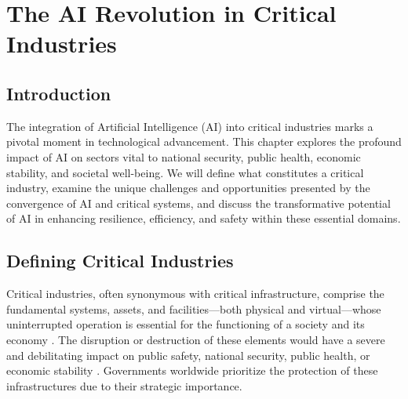 \chapter{The AI Revolution in Critical Industries}
\label{chap:the_ai_revolution_in_critical_industries}

\section{Introduction}
\label{sec:ai_revolution_introduction}
The integration of Artificial Intelligence (AI) into critical industries marks a pivotal moment in technological advancement. This chapter explores the profound impact of AI on sectors vital to national security, public health, economic stability, and societal well-being. We will define what constitutes a critical industry, examine the unique challenges and opportunities presented by the convergence of AI and critical systems, and discuss the transformative potential of AI in enhancing resilience, efficiency, and safety within these essential domains.

\section{Defining Critical Industries}
\label{sec:defining_critical_industries}
Critical industries, often synonymous with critical infrastructure, comprise the fundamental systems, assets, and facilities—both physical and virtual—whose uninterrupted operation is essential for the functioning of a society and its economy \parencite{NIST2020}. The disruption or destruction of these elements would have a severe and debilitating impact on public safety, national security, public health, or economic stability \parencite{IBM2023}. Governments worldwide prioritize the protection of these infrastructures due to their strategic importance.

